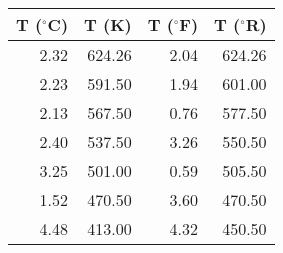 \begin{tabular}{|rrrr|}\hline 
T ($^{\circ}$C) & T (K) 	& T ($^{\circ}$F) 	& T ($^{\circ}$R)\\ \hline 
    2.32 		&   624.26 	&     2.04 			&   624.26 \\ 
    2.23 		&   591.50 	&     1.94 			&   601.00 \\ 
    2.13 		&   567.50 	&     0.76 			&   577.50 \\ 
    2.40 		&   537.50 	&     3.26 			&   550.50 \\ 
    3.25 		&   501.00 	&     0.59 			&   505.50 \\ 
    1.52 		&   470.50 	&     3.60 			&   470.50 \\ 
    4.48 		&   413.00 	&     4.32 			&   450.50 \\ \hline 
\end{tabular}
